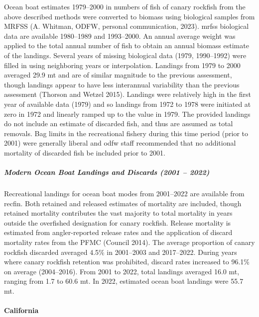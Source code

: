\documentclass[11pt,
  english,
  letterpaper,
]{article}
\begin{document}
Ocean boat estimates 1979--2000 in numbers of fish of canary rockfish from the above described methods were converted to biomass using biological samples from MRFSS (A. Whitman, ODFW, personal communication, 2023). \Gls{mrfss} biological data are available 1980--1989 and 1993--2000. An annual average weight was applied to the total annual number of fish to obtain an annual biomass estimate of the landings. Several years of missing biological data (1979, 1990--1992) were filled in using neighboring years or interpolation. Landings from 1979 to 2000 averaged 29.9 mt and are of similar magnitude to the previous assessment, though landings appear to have less interannual variability than the previous assessment (Thorson and Wetzel 2015). Landings were relatively high in the first year of available data (1979) and so landings from 1972 to 1978 were initiated at zero in 1972 and linearly ramped up to the value in 1979. The provided landings do not include an estimate of discarded fish, and thus are assumed as total removals. Bag limits in the recreational fishery during this time period (prior to 2001) were generally liberal and \gls{odfw} staff recommended that no additional mortality of discarded fish be included prior to 2001.

\hypertarget{modern-ocean-boat-landings-and-discards-2001-2022}{%
\subparagraph{Modern Ocean Boat Landings and Discards (2001 -- 2022)}\label{modern-ocean-boat-landings-and-discards-2001-2022}}

Recreational landings for ocean boat modes from 2001--2022 are available from \gls{recfin}. Both retained and released estimates of mortality are included, though retained mortality contributes the vast majority to total mortality in years outside the overfished designation for canary rockfish. Release mortality is estimated from angler-reported release rates and the application of discard mortality rates from the PFMC (Council 2014). The average proportion of canary rockfish discarded averaged 4.5\% in 2001--2003 and 2017--2022. During years where canary rockfish retention was prohibited, discard rates increased to 96.1\% on average (2004--2016). From 2001 to 2022, total landings averaged 16.0 mt, ranging from 1.7 to 60.6 mt. In 2022, estimated ocean boat landings were 55.7 mt.

\hypertarget{california-1}{%
\paragraph{California}\label{california-1}}
\end{document}
